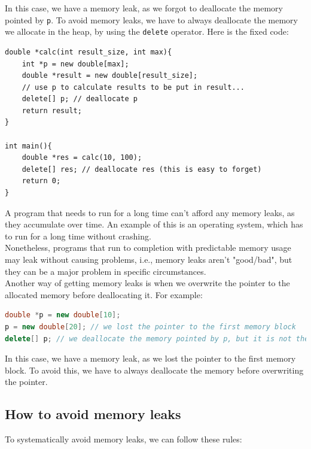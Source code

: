 In this case, we have a memory leak, as we forgot to deallocate the memory pointed by \texttt{p}. To avoid memory leaks, we have to
always deallocate the memory we allocate in the heap, by using the \texttt{delete} operator. Here is the fixed code:\\

\begin{lstlisting}
double *calc(int result_size, int max){
    int *p = new double[max];
    double *result = new double[result_size];
    // use p to calculate results to be put in result...
    delete[] p; // deallocate p
    return result;
}

int main(){
    double *res = calc(10, 100);
    delete[] res; // deallocate res (this is easy to forget)
    return 0;
}
\end{lstlisting}

A program that needs to run for a long time can't afford any memory leaks, as they accumulate over time. An example of
this is an operating system, which has to run for a long time without crashing.\\

Nonetheless, programs that run to completion with predictable memory usage may leak without causing problems, i.e., memory
leaks aren't "good/bad", but they can be a major problem in specific circumstances.\\

Another way of getting memory leaks is when we overwrite the pointer to the allocated memory before deallocating it. For example:\\

\begin{lstlisting}[language=C++]
double *p = new double[10];
p = new double[20]; // we lost the pointer to the first memory block
delete[] p; // we deallocate the memory pointed by p, but it is not the memory we allocated
\end{lstlisting}

In this case, we have a memory leak, as we lost the pointer to the first memory block. To avoid this, we have to always deallocate
the memory before overwriting the pointer.\\

\subsection{How to avoid memory leaks}

To systematically avoid memory leaks, we can follow these rules:

